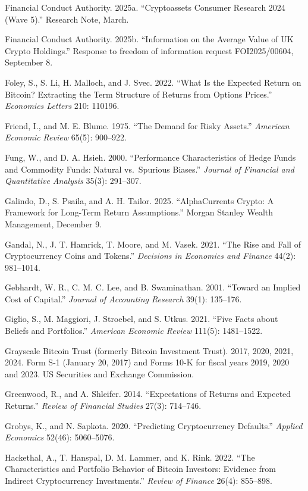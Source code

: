\documentclass[11pt]{article}
\begin{document}
\begin{list}{}{\setlength{\itemindent}{-1.5em}\setlength{\leftmargin}{1.5em}\setlength{\itemsep}{2pt}\setlength{\parsep}{0pt}}
\item Financial Conduct Authority. 2025a. ``Cryptoassets Consumer Research 2024 (Wave 5).'' Research Note, March.
\item Financial Conduct Authority. 2025b. ``Information on the Average Value of UK Crypto Holdings.'' Response to freedom of information request FOI2025/00604, September 8.
\item Foley, S., S. Li, H. Malloch, and J. Svec. 2022. ``What Is the Expected Return on Bitcoin? Extracting the Term Structure of Returns from Options Prices.'' \emph{Economics Letters} 210: 110196.
\item Friend, I., and M. E. Blume. 1975. ``The Demand for Risky Assets.'' \emph{American Economic Review} 65(5): 900--922.
\item Fung, W., and D. A. Hsieh. 2000. ``Performance Characteristics of Hedge Funds and Commodity Funds: Natural vs.\ Spurious Biases.'' \emph{Journal of Financial and Quantitative Analysis} 35(3): 291--307.
\item Galindo, D., S. Psaila, and A. H. Tailor. 2025. ``AlphaCurrents Crypto: A Framework for Long-Term Return Assumptions.'' Morgan Stanley Wealth Management, December 9.
\item Gandal, N., J. T. Hamrick, T. Moore, and M. Vasek. 2021. ``The Rise and Fall of Cryptocurrency Coins and Tokens.'' \emph{Decisions in Economics and Finance} 44(2): 981--1014.
\item Gebhardt, W. R., C. M. C. Lee, and B. Swaminathan. 2001. ``Toward an Implied Cost of Capital.'' \emph{Journal of Accounting Research} 39(1): 135--176.
\item Giglio, S., M. Maggiori, J. Stroebel, and S. Utkus. 2021. ``Five Facts about Beliefs and Portfolios.'' \emph{American Economic Review} 111(5): 1481--1522.
\item Grayscale Bitcoin Trust (formerly Bitcoin Investment Trust). 2017, 2020, 2021, 2024. Form S-1 (January 20, 2017) and Forms 10-K for fiscal years 2019, 2020 and 2023. US Securities and Exchange Commission.
\item Greenwood, R., and A. Shleifer. 2014. ``Expectations of Returns and Expected Returns.'' \emph{Review of Financial Studies} 27(3): 714--746.
\item Grobys, K., and N. Sapkota. 2020. ``Predicting Cryptocurrency Defaults.'' \emph{Applied Economics} 52(46): 5060--5076.
\item Hackethal, A., T. Hanspal, D. M. Lammer, and K. Rink. 2022. ``The Characteristics and Portfolio Behavior of Bitcoin Investors: Evidence from Indirect Cryptocurrency Investments.'' \emph{Review of Finance} 26(4): 855--898.

\end{list}
\end{document}
